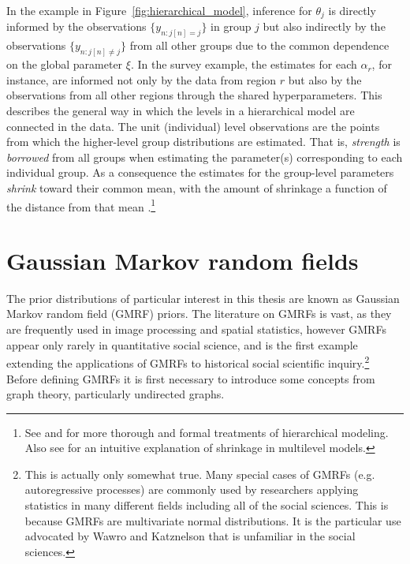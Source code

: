 In the example in Figure~\ref{fig:hierarchical_model}, 
inference for $\theta_j$ is directly informed by the observations 
 $\{y_{n : j[n] = j}\}$ in group $j$ but also indirectly by the observations  
 $\{y_{n : j[n] \neq j}\}$ from all other groups due to the common 
dependence on the global parameter $\xi$. In the survey example, the estimates for each 
$\alpha_r$, for instance, are informed not only by the data from region $r$ but also by the 
observations from all other regions through the shared hyperparameters. This describes
the general way in which the levels in a hierarchical model are connected in the data. 
The unit (individual) level observations are the points from which the higher-level group 
distributions are estimated. That is, {\it strength} is {\it borrowed} from all groups when estimating 
the parameter(s) corresponding to each individual group. As a consequence the estimates for the 
group-level parameters {\it shrink} toward their common mean, with the amount of shrinkage a 
function of the distance from that mean 
.\footnote{See  
and  for more thorough and formal treatments of hierarchical modeling. 
Also see  for an intuitive explanation of shrinkage in multilevel models.}



\section{Gaussian Markov random fields}
\label{gmrf}

The prior distributions of particular interest in this thesis are known as Gaussian Markov random 
field (GMRF) priors. The literature on GMRFs is vast, as they are frequently used in image processing 
and spatial statistics, however GMRFs appear only rarely in quantitative social science, and 
 is the first example extending the applications of GMRFs to historical 
social scientific inquiry.\footnote{This is actually only somewhat true. Many special cases of GMRFs  
(e.g. autoregressive processes) are commonly used by researchers applying statistics in many different 
fields including all of the social sciences. This is because GMRFs are  multivariate normal distributions. 
It is the particular use advocated by Wawro and Katznelson that is unfamiliar in the social sciences.} 
Before defining GMRFs it is first necessary to introduce some concepts from graph theory, particularly 
undirected graphs. 

